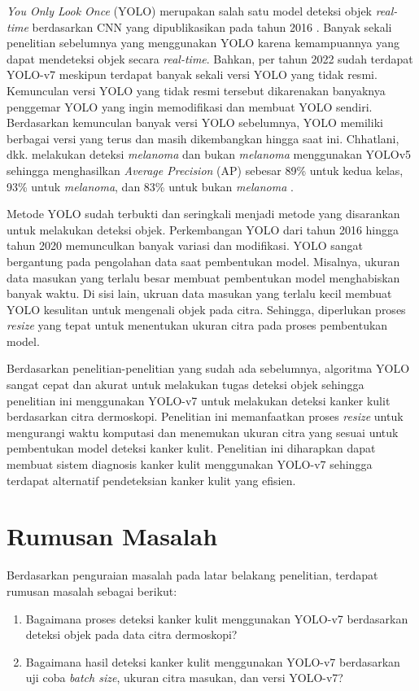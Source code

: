     \textit{You Only Look Once} (YOLO) merupakan salah satu model deteksi objek \textit{real-time} berdasarkan CNN yang dipublikasikan pada tahun 2016 \citep{Redmon2016a}. Banyak sekali penelitian sebelumnya yang menggunakan YOLO karena kemampuannya yang dapat mendeteksi objek secara \textit{real-time}. Bahkan, per tahun 2022 sudah terdapat YOLO-v7 meskipun terdapat banyak sekali versi YOLO yang tidak resmi. Kemunculan versi YOLO yang tidak resmi tersebut dikarenakan banyaknya penggemar YOLO yang ingin memodifikasi dan membuat YOLO sendiri. Berdasarkan kemunculan banyak versi YOLO sebelumnya, YOLO memiliki berbagai versi yang terus dan masih dikembangkan hingga saat ini. Chhatlani, dkk. melakukan deteksi \textit{melanoma} dan bukan \textit{melanoma} menggunakan YOLOv5 sehingga menghasilkan \textit{Average Precision} (AP) sebesar 89\% untuk kedua kelas, 93\% untuk \textit{melanoma}, dan 83\% untuk bukan \textit{melanoma} \citep{Chhatlani2022a}.
    
    Metode YOLO sudah terbukti dan seringkali menjadi metode yang disarankan untuk melakukan deteksi objek. Perkembangan YOLO dari tahun 2016 hingga tahun 2020 memunculkan banyak variasi dan modifikasi. YOLO sangat bergantung pada pengolahan data saat pembentukan model. Misalnya, ukuran data masukan yang terlalu besar membuat pembentukan model menghabiskan banyak waktu. Di sisi lain, ukruan data masukan yang terlalu kecil membuat YOLO kesulitan untuk mengenali objek pada citra. Sehingga, diperlukan proses \textit{resize} yang tepat untuk menentukan ukuran citra pada proses pembentukan model.
    
    Berdasarkan penelitian-penelitian yang sudah ada sebelumnya, algoritma YOLO sangat cepat dan akurat untuk melakukan tugas deteksi objek sehingga penelitian ini menggunakan YOLO-v7 untuk melakukan deteksi kanker kulit berdasarkan citra dermoskopi. Penelitian ini memanfaatkan proses \textit{resize} untuk mengurangi waktu komputasi dan menemukan ukuran citra yang sesuai untuk pembentukan model deteksi kanker kulit. Penelitian ini diharapkan dapat membuat sistem diagnosis kanker kulit menggunakan YOLO-v7 sehingga terdapat alternatif pendeteksian kanker kulit yang efisien.

    \section{Rumusan Masalah}
    Berdasarkan penguraian masalah pada latar belakang penelitian, terdapat rumusan masalah sebagai berikut:
    \begin{enumerate}
        \item Bagaimana proses deteksi kanker kulit menggunakan YOLO-v7 berdasarkan deteksi objek pada data citra dermoskopi?
        \item Bagaimana hasil deteksi kanker kulit menggunakan YOLO-v7 berdasarkan uji coba \textit{batch size}, ukuran citra masukan, dan versi YOLO-v7?
    \end{enumerate}

